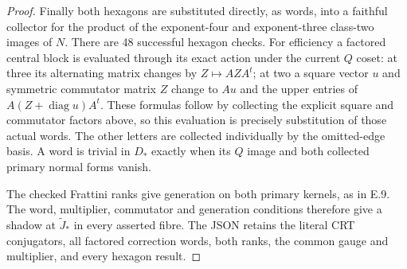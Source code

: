 \begin{proof}
Finally both hexagons are substituted directly, as words, into a
faithful collector for the product of the exponent-four and
exponent-three class-two images of $N$. There are 48 successful
hexagon checks. For efficiency a factored central block is
evaluated through its exact action under the current $Q$ coset:
at three its alternating matrix changes by $Z\mapsto AZA^t$;
at two a square vector $u$ and symmetric commutator matrix $Z$
change to $Au$ and the upper entries of
$A(Z+\operatorname{diag}u)A^t$. These formulas follow by collecting
the explicit square and commutator factors above, so this evaluation
is precisely substitution of those actual words. The other letters
are collected individually by the omitted-edge basis. A word is
trivial in $D_*$ exactly when its $Q$ image and both collected
primary normal forms vanish.

The checked Frattini ranks give generation on both primary kernels,
as in E.9. The word, multiplier, commutator and generation conditions
therefore give a shadow at $\widetilde J_*$ in every asserted fibre.
The JSON retains the literal CRT conjugators, all factored correction
words, both ranks, the common gauge and multiplier, and every
hexagon result.
\end{proof}

